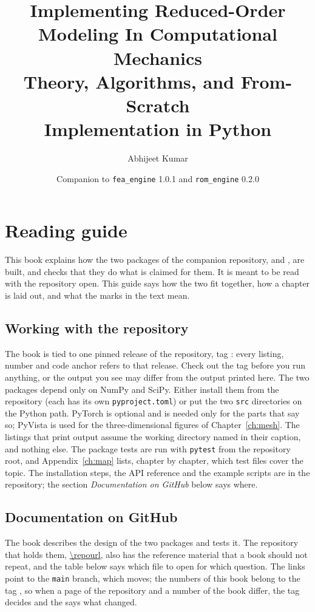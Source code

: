 \documentclass[11pt,a4paper,twoside,openany]{book}
\title{Implementing Reduced-Order Modeling In Computational Mechanics\\[1ex]{\Large Theory, Algorithms, and From-Scratch\\Implementation in Python}}
\author{Abhijeet Kumar}
\date{Companion to \texttt{fea\_engine} 1.0.1 and \texttt{rom\_engine} 0.2.0}
\begin{document}


\frontmatter
\maketitle



\chapter*{Reading guide}
This book explains how the two packages of the companion repository, \fea{} and \rom{}, are built, and checks that they do what is claimed for them. It is meant to be read with the repository open. This guide says how the two fit together, how a chapter is laid out, and what the marks in the text mean.

\section*{Working with the repository}

The book is tied to one pinned release of the repository, tag \booktag{}: every listing, number and code anchor refers to that release. Check out the tag before you run anything, or the output you see may differ from the output printed here. The two packages depend only on NumPy and SciPy. Either install them from the repository (each has its own \texttt{pyproject.toml}) or put the two \texttt{src} directories on the Python path. PyTorch is optional and is needed only for the parts that say so; PyVista is used for the three-dimensional figures of Chapter~\ref{ch:mesh}. The listings that print output assume the working directory named in their caption, and nothing else. The package tests are run with \texttt{pytest} from the repository root, and Appendix~\ref{ch:map} lists, chapter by chapter, which test files cover the topic. The installation steps, the API reference and the example scripts are in the repository; the section \emph{Documentation on GitHub} below says where.

\section*{Documentation on GitHub}

The book describes the design of the two packages and tests it. The repository that holds them, \url{\repourl}, also has the reference material that a book should not repeat, and the table below says which file to open for which question. The links point to the \texttt{main} branch, which moves; the numbers of this book belong to the tag \booktag, so when a page of the repository and a number of the book differ, the tag decides and the  says what changed.
\end{document}
